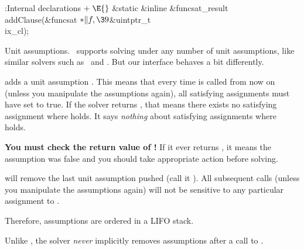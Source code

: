 \Y\B\4:Internal declarations\X${}\mathrel+\E{}$\6
\&{static} \&{inline} \&{funcsat\_result} \\{addClause}(\&{funcsat} ${}{*}\|f,%
\39{}$\&{uintptr\_t} \\{ix\_cl});\par
\fi

Unit assumptions. \funcsat\ supports solving under any number of unit
assumptions, like similar solvers such as \minisat\ and \picosat. But our
interface behaves a bit differently.

\numberedlist

\li {} adds a unit assumption .
This means that
every time  is called from now on (unless you manipulate
the
assumptions again), all satisfying assignments must have  set to true.
If the
solver returns , that means there exists no satisfying
assignment
where  holds. It says {\it nothing} about satisfying assignments where %
holds.

{\bf You must check the return value of !} If it
ever
returns , it means the assumption was false and you should
take
appropriate action before solving.

\li {} will remove the last unit assumption pushed
(call it
). All subsequent calls (unless you manipulate the assumptions again)
will
not be sensitive to any particular assignment to .

\li Therefore, assumptions are ordered in a LIFO stack.

\li Unlike \picosat, the solver \textit{never} implicitly removes assumptions
after a call to .

\endnumberedlist

